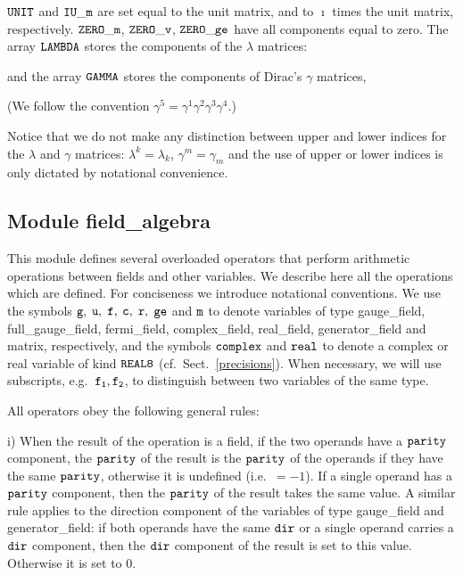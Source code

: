 
$\tt UNIT$ and $\tt IU\_m$ are set equal to the unit matrix, 
and to $\imath$ times the unit matrix, respectively.
$\tt ZERO\_m$, $\tt ZERO\_v$, $\tt ZERO\_ge$ have all
components equal to zero.  The array $\tt LAMBDA$ stores
the components of the $\lambda$ matrices:


{\parindent=0pt
and the array $\tt GAMMA$ stores the components of 
Dirac's $\gamma$ matrices,}


{\parindent=0pt (We follow the convention $\gamma^5 = \gamma^1 \gamma^2
\gamma^3 \gamma^4$.)}

Notice that we do not make any distinction between upper and lower indices
for the $\lambda$ and $\gamma$ matrices:  $\lambda^k=\lambda_k$,
$\gamma^m=\gamma_m$ and the use of upper or lower indices is only dictated
by notational convenience.

\subsection{Module field\_algebra}      
\label{fieldalgebra}

This module defines several overloaded operators that perform
arithmetic operations between fields and other variables.
We describe here all the operations which are defined.  For conciseness
we introduce notational conventions. We use the symbols $\tt g,$ 
$\tt u,$ $\tt f,$ $\tt c,$ $\tt r,$ $\tt ge$ and $\tt m$ 
to denote variables of type gauge\_field, full\_gauge\_field, 
fermi\_field, complex\_field, real\_field, 
generator\_field and matrix, respectively, and the
symbols $\tt complex$ and $\tt real$ to denote a complex or real variable
of kind $\tt REAL8$ (cf.~Sect.~\ref{precisions}).  When necessary, 
we will use subscripts, e.g.~$\tt f_1, f_2$, to distinguish between two 
variables of the same type.

All operators obey the following general rules:

i) When the result of the operation is a field, if the two operands
have a $\tt parity$ component, the $\tt parity$ of the result is
the $\tt parity$ of the operands if they have the same $\tt parity$,
otherwise it is undefined (i.e.~$= -1$).  If a single operand
has a $\tt parity$ component, then the $\tt parity$ of the result
takes the same value.  A similar rule applies to the direction
component of the variables of type gauge\_field and generator\_field: if 
both operands have the same $\tt dir$ or a single operand carries a $\tt dir$ 
component, then the $\tt dir$ component of the result is set to this
value.  Otherwise it is set to $0$.
 
